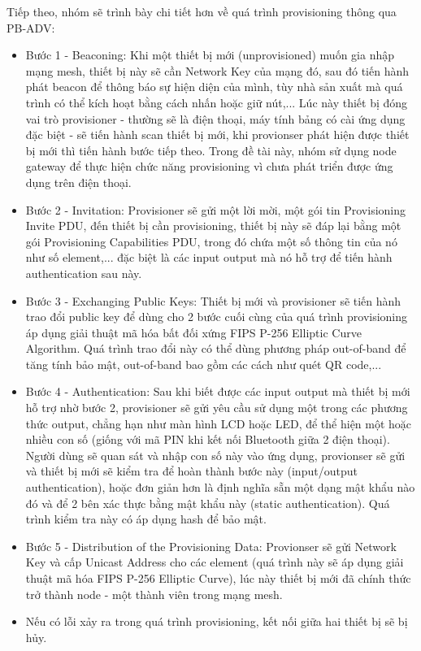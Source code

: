             Tiếp theo, nhóm sẽ trình bày chi tiết hơn về quá trình provisioning thông qua PB-ADV:
            \begin{itemize}\label{security}
                \item Bước 1 - Beaconing: Khi một thiết bị mới (unprovisioned) muốn gia nhập mạng mesh, thiết bị này sẽ cần Network Key của mạng đó, sau đó tiến hành phát beacon để thông báo sự hiện diện của mình, tùy nhà sản xuất mà quá trình có thể kích hoạt bằng cách nhấn hoặc giữ nút,... Lúc này thiết bị đóng vai trò provisioner - thường sẽ là điện thoại, máy tính bảng có cài ứng dụng đặc biệt - sẽ tiến hành scan thiết bị mới, khi provionser phát hiện được thiết bị mới thì tiến hành bước tiếp theo. Trong đề tài này, nhóm sử dụng node gateway để thực hiện chức năng provisioning vì chưa phát triển được ứng dụng trên điện thoại.
                \item Bước 2 - Invitation: Provisioner sẽ gửi một lời mời, một gói tin Provisioning Invite PDU, đến thiết bị cần provisioning, thiết bị này sẽ đáp lại bằng một gói Provisioning Capabilities PDU, trong đó chứa một số thông tin của nó như số element,... đặc biệt là các input output mà nó hỗ trợ để tiến hành authentication sau này.
                \item Bước 3 - Exchanging Public Keys: Thiết bị mới và provisioner sẽ tiến hành trao đổi public key để dùng cho 2 bước cuối cùng của quá trình provisioning áp dụng giải thuật mã hóa bất đối xứng FIPS P-256 Elliptic Curve Algorithm. Quá trình trao đổi này có thể dùng phương pháp out-of-band để tăng tính bảo mật, out-of-band bao gồm các cách như quét QR code,...
                \item Bước 4 - Authentication: Sau khi biết được các input output mà thiết bị mới hỗ trợ nhờ bước 2, provisioner sẽ gửi yêu cầu sử dụng một trong các phương thức output, chẳng hạn như màn hình LCD hoặc LED, để thể hiện một hoặc nhiều con số (giống với mã PIN khi kết nối Bluetooth giữa 2 điện thoại). Người dùng sẽ quan sát và nhập con số này vào ứng dụng, provionser sẽ gửi và thiết bị mới sẽ kiểm tra để hoàn thành bước này (input/output authentication), hoặc đơn giản hơn là định nghĩa sẵn một dạng mật khẩu nào đó và để 2 bên xác thực bằng mật khẩu này (static authentication). Quá trình kiểm tra này có áp dụng hash để bảo mật.
                \item Bước 5 - Distribution of the Provisioning Data: Provionser sẽ gửi Network Key và cấp Unicast Address cho các element (quá trình này sẽ áp dụng giải thuật mã hóa FIPS P-256 Elliptic Curve), lúc này thiết bị mới đã chính thức trở thành node - một thành viên trong mạng mesh.
                \item Nếu có lỗi xảy ra trong quá trình provisioning, kết nối giữa hai thiết bị sẽ bị hủy.
            \end{itemize}
